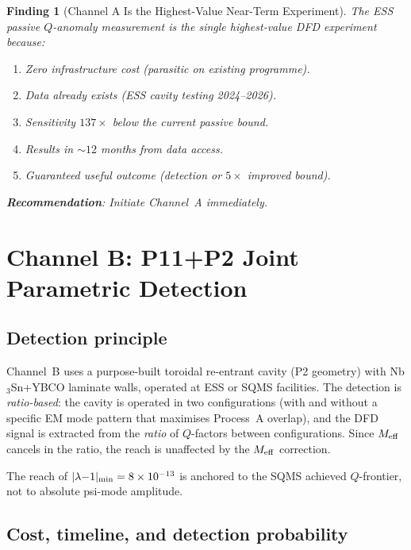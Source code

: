 \documentclass[11pt]{article}
\newtheorem{finding}{Finding}
\newcommand{\ee}[1]{\times 10^{#1}}
\newcommand{\Meff}{M_{\rm eff}}
\newcommand{\lamdiff}{|\lambda{-}1|}
\begin{document}
\begin{finding}[Channel A Is the Highest-Value Near-Term Experiment]
\label{find:channel-A}
The ESS passive $Q$-anomaly measurement is the single highest-value
DFD experiment because:
\begin{enumerate}[nosep]
\item Zero infrastructure cost (parasitic on existing programme).
\item Data already exists (ESS cavity testing 2024--2026).
\item Sensitivity $137\times$ below the current passive bound.
\item Results in $\sim 12$ months from data access.
\item Guaranteed useful outcome (detection or $5\times$ improved bound).
\end{enumerate}
\textbf{Recommendation}: Initiate Channel~A immediately.
\end{finding}

\section{Channel B: P11+P2 Joint Parametric Detection}
\label{sec:channel-B}

\subsection{Detection principle}

Channel~B uses a purpose-built toroidal re-entrant cavity (P2 geometry)
with Nb$_3$Sn+YBCO laminate walls, operated at ESS or SQMS facilities.
The detection is \emph{ratio-based}: the cavity is operated in two
configurations (with and without a specific EM mode pattern that
maximises Process~A overlap), and the DFD signal is extracted from the
\emph{ratio} of $Q$-factors between configurations. Since $\Meff$
cancels in the ratio, the reach is unaffected by the $\Meff$ correction.

The reach of $\lamdiff_{\rm min} = 8\ee{-13}$ is anchored to the SQMS
achieved $Q$-frontier, not to absolute psi-mode amplitude.

\subsection{Cost, timeline, and detection probability}
\end{document}
